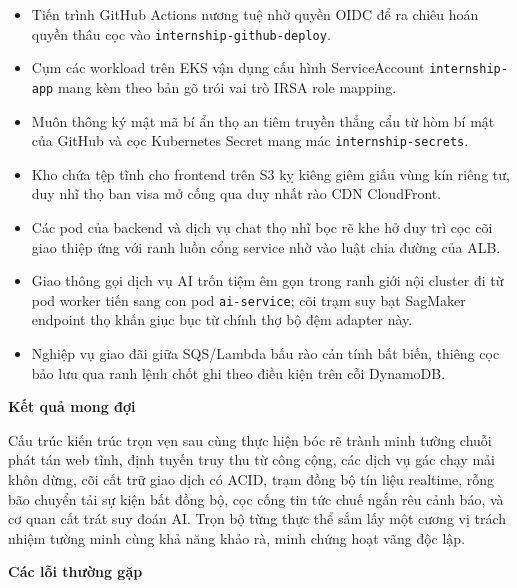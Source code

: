 \begin{itemize}
\tightlist
\item
  Tiến trình GitHub Actions nương tuệ nhờ quyền OIDC để ra chiêu hoán
  quyền thâu cọc vào \texttt{internship-\allowbreak{}github-\allowbreak{}deploy}.
\item
  Cụm các workload trên EKS vận dụng cấu hình ServiceAccount
  \texttt{internship-\allowbreak{}app} mang kèm theo bản gõ trói vai trò IRSA role
  mapping.
\item
  Muôn thông ký mật mã bí ẩn thọ an tiêm truyền thẳng cẩu từ hòm bí mật
  của GitHub và cọc Kubernetes Secret mang mác
  \texttt{internship-\allowbreak{}secrets}.
\item
  Kho chứa tệp tĩnh cho frontend trên S3 kỵ kiêng giêm giấu vùng kín
  riêng tư, duy nhĩ thọ ban visa mở cống qua duy nhất rào CDN
  CloudFront.
\item
  Các pod của backend và dịch vụ chat thọ nhĩ bọc rẽ khe hở duy trì cọc
  cõi giao thiệp ứng với ranh luồn cổng service nhờ vào luật chia đường
  của ALB.
\item
  Giao thông gọi dịch vụ AI trốn tiệm êm gọn trong ranh giới nội cluster
  đi từ pod worker tiến sang con pod \texttt{ai-\allowbreak{}service}; cõi trạm suy
  bạt SagMaker endpoint thọ khấn giục bục từ chính thợ bộ đệm adapter
  này.
\item
  Nghiệp vụ giao đãi giữa SQS/Lambda bấu rào cản tính bất biến, thiêng
  cọc bảo lưu qua ranh lệnh chốt ghi theo điều kiện trên cỗi DynamoDB.
\end{itemize}

\vspace{0.5em}\noindent\textbf{Kết quả mong đợi}\par

Cấu trúc kiến trúc trọn vẹn sau cùng thực hiện bóc rẽ trành minh tường
chuỗi phát tán web tĩnh, định tuyến truy thu từ công cộng, các dịch vụ
gác chạy mải khôn dừng, cõi cất trữ giao dịch có ACID, trạm đồng bộ tín
liệu realtime, rỗng bão chuyển tải sự kiện bất đồng bộ, cọc cống tin tức
chuế ngắn rêu cảnh báo, và cơ quan cất trát suy đoán AI. Trọn bộ từng
thực thể sắm lấy một cương vị trách nhiệm tường minh cùng khả năng khảo
rà, minh chứng hoạt vãng độc lập.

\vspace{0.5em}\noindent\textbf{Các lỗi thường
gặp}\par

